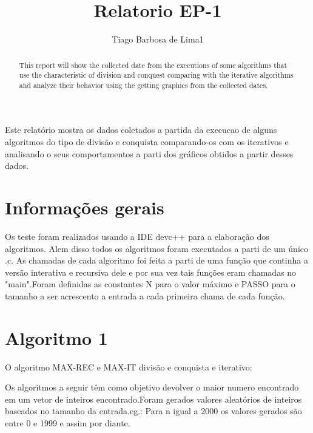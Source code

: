 \documentclass[12pt]{article}
\title{Relatorio EP-1}
\author{Tiago Barbosa de Lima{1}}
\begin{document}
 
	
	\maketitle
	
	\begin{abstract}
		
		This report will show the collected date from the executions of some algorithms that
		use the characteristic of division and conquest comparing with the iterative algorithms and analyze their behavior using the getting graphics from the collected dates.
	\end{abstract}
	
	\begin{resumo} 
		Este relatório mostra os dados coletados a partida da execucao de alguns algoritmos do tipo de divisão e conquista comparando-os com os iterativos e analisando o seus comportamentos a parti dos gráficos obtidos a partir desses dados.
	\end{resumo}
	
	
	\section{Informações gerais}
	
	
	Os teste foram realizados usando a IDE devc++ para a elaboração dos 
	algoritmos. Alem disso todos os algoritmos foram executados a parti de um único .c.
	As chamadas de cada algoritmo foi feita a parti de  uma função que continha a versão 
	interativa e recursiva dele e por sua vez tais funções eram chamadas no "main".Foram definidas as constantes N para o valor máximo e PASSO para o tamanho a ser acrescento a entrada a cada primeira chama de cada função.
	
	
	
	
	
	\section{Algoritmo 1} \label{sec:MAX}
	
	O algoritmo MAX-REC e MAX-IT divisão e conquista e iterativo:
	
	Os algoritmos a seguir têm como objetivo devolver o 
	maior numero encontrado em um vetor de inteiros encontrado.Foram gerados valores aleatórios de inteiros baseados no tamanho da entrada.eg.: Para n igual a 2000 os valores gerados são entre 0 e 1999 e assim por diante.
	
\end{document}
